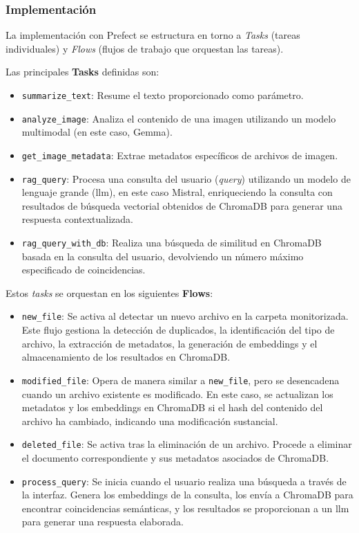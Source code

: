 \subsubsection{Implementación}
La implementación con Prefect se estructura en torno a \textit{Tasks} (tareas individuales) y \textit{Flows} (flujos de trabajo que orquestan las tareas).

Las principales \textbf{Tasks} definidas son:
\begin{itemize}
    \item \texttt{summarize\_text}: Resume el texto proporcionado como parámetro.
    \item \texttt{analyze\_image}: Analiza el contenido de una imagen utilizando un modelo multimodal (en este caso, Gemma).
    \item \texttt{get\_image\_metadata}: Extrae metadatos específicos de archivos de imagen.
    \item \texttt{rag\_query}: Procesa una consulta del usuario (\textit{query}) utilizando un modelo de lenguaje grande (\gls{llm}), en este caso Mistral, enriqueciendo la consulta con resultados de búsqueda vectorial obtenidos de ChromaDB para generar una respuesta contextualizada.
    \item \texttt{rag\_query\_with\_db}: Realiza una búsqueda de similitud en ChromaDB basada en la consulta del usuario, devolviendo un número máximo especificado de coincidencias.
\end{itemize}

Estos \textit{tasks} se orquestan en los siguientes \textbf{Flows}:
\begin{itemize}
    \item \texttt{new\_file}: Se activa al detectar un nuevo archivo en la carpeta monitorizada. Este flujo gestiona la detección de duplicados, la identificación del tipo de archivo, la extracción de metadatos, la generación de embeddings y el almacenamiento de los resultados en ChromaDB.
    \item \texttt{modified\_file}: Opera de manera similar a \texttt{new\_file}, pero se desencadena cuando un archivo existente es modificado. En este caso, se actualizan los metadatos y los embeddings en ChromaDB si el hash del contenido del archivo ha cambiado, indicando una modificación sustancial.
    \item \texttt{deleted\_file}: Se activa tras la eliminación de un archivo. Procede a eliminar el documento correspondiente y sus metadatos asociados de ChromaDB.
    \item \texttt{process\_query}: Se inicia cuando el usuario realiza una búsqueda a través de la interfaz. Genera los embeddings de la consulta, los envía a ChromaDB para encontrar coincidencias semánticas, y los resultados se proporcionan a un \gls{llm} para generar una respuesta elaborada.
\end{itemize}

